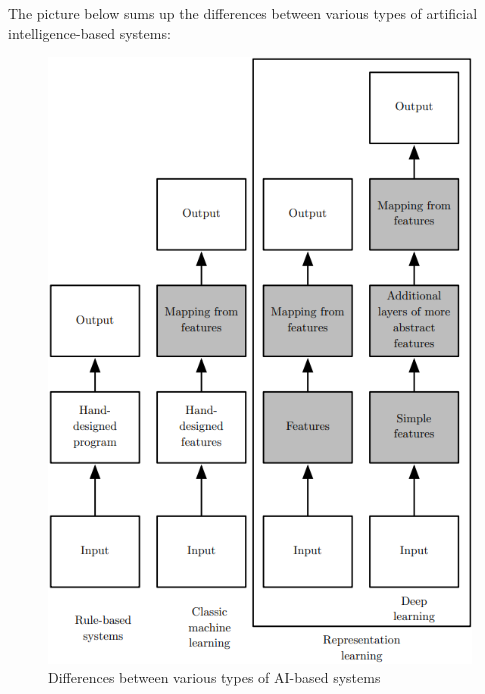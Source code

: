 The picture below sums up the differences between various types of artificial intelligence-based systems:

\begin{figure}[hbt]
    \centering
    \includegraphics[scale=0.6]{Images/Chapter 6/types-ai.png}
    \caption{Differences between various types of AI-based systems}
    \label{fig:ch6-aitypesdifferences}
\end{figure}